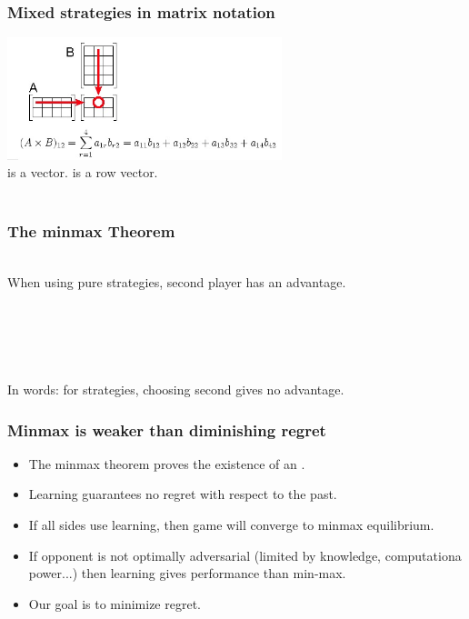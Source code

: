 \documentclass[handout]{beamer}
\begin{document}
\begin{frame}
\frametitle{Mixed strategies in matrix notation}
\includegraphics[width=8cm]{figures/matrixProduct.jpg}
\pause \\
\R{$\Q$} is a  vector.  is a row vector.
\pause \\ ~\\
\end{frame}

\begin{frame}
  \frametitle{The minmax Theorem}
~\\
When using pure strategies, second player has an advantage.
~\\~\\ ~\pause
{}
\\ ~ \\ 
\R{\[ \minp \maxq \mpq = \maxq \minp \mpq \]}
\\ ~ \\ 
In words: for  strategies, choosing second gives no advantage.
\end{frame}

\begin{frame}
\frametitle{Minmax is weaker than diminishing regret}
\begin{itemize}
\item The minmax theorem proves the existence of an .
\item Learning guarantees no regret with respect to the past.
\item If all sides use learning, then game will converge to minmax equilibrium.
\item If opponent is not optimally adversarial (limited by knowledge, computationa power...) then learning gives  performance than min-max.
\item Our goal is to minimize regret.
\end{itemize}
\end{frame}
\end{document}
